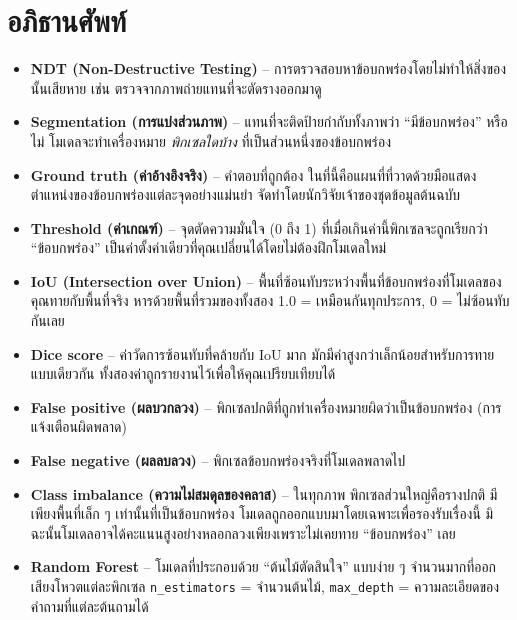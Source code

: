 \documentclass[11pt]{article}
\begin{document}
\section*{อภิธานศัพท์}
\begin{itemize}
  \item \textbf{NDT (Non-Destructive Testing)} -- การตรวจสอบหาข้อบกพร่องโดยไม่ทำให้สิ่งของนั้นเสียหาย เช่น ตรวจจากภาพถ่ายแทนที่จะตัดรางออกมาดู
  \item \textbf{Segmentation (การแบ่งส่วนภาพ)} -- แทนที่จะติดป้ายกำกับทั้งภาพว่า ``มีข้อบกพร่อง'' หรือไม่ โมเดลจะทำเครื่องหมาย \emph{พิกเซลใดบ้าง} ที่เป็นส่วนหนึ่งของข้อบกพร่อง
  \item \textbf{Ground truth (ค่าอ้างอิงจริง)} -- คำตอบที่ถูกต้อง ในที่นี้คือแผนที่ที่วาดด้วยมือแสดงตำแหน่งของข้อบกพร่องแต่ละจุดอย่างแม่นยำ จัดทำโดยนักวิจัยเจ้าของชุดข้อมูลต้นฉบับ
  \item \textbf{Threshold (ค่าเกณฑ์)} -- จุดตัดความมั่นใจ (0 ถึง 1) ที่เมื่อเกินค่านี้พิกเซลจะถูกเรียกว่า ``ข้อบกพร่อง'' เป็นค่าตั้งค่าเดียวที่คุณเปลี่ยนได้โดยไม่ต้องฝึกโมเดลใหม่
  \item \textbf{IoU (Intersection over Union)} -- พื้นที่ซ้อนทับระหว่างพื้นที่ข้อบกพร่องที่โมเดลของคุณทายกับพื้นที่จริง หารด้วยพื้นที่รวมของทั้งสอง 1.0 = เหมือนกันทุกประการ, 0 = ไม่ซ้อนทับกันเลย
  \item \textbf{Dice score} -- ค่าวัดการซ้อนทับที่คล้ายกับ IoU มาก มักมีค่าสูงกว่าเล็กน้อยสำหรับการทายแบบเดียวกัน ทั้งสองค่าถูกรายงานไว้เพื่อให้คุณเปรียบเทียบได้
  \item \textbf{False positive (ผลบวกลวง)} -- พิกเซลปกติที่ถูกทำเครื่องหมายผิดว่าเป็นข้อบกพร่อง (การแจ้งเตือนผิดพลาด)
  \item \textbf{False negative (ผลลบลวง)} -- พิกเซลข้อบกพร่องจริงที่โมเดลพลาดไป
  \item \textbf{Class imbalance (ความไม่สมดุลของคลาส)} -- ในทุกภาพ พิกเซลส่วนใหญ่คือรางปกติ มีเพียงพื้นที่เล็ก ๆ เท่านั้นที่เป็นข้อบกพร่อง โมเดลถูกออกแบบมาโดยเฉพาะเพื่อรองรับเรื่องนี้ มิฉะนั้นโมเดลอาจได้คะแนนสูงอย่างหลอกลวงเพียงเพราะไม่เคยทาย ``ข้อบกพร่อง'' เลย
  \item \textbf{Random Forest} -- โมเดลที่ประกอบด้วย ``ต้นไม้ตัดสินใจ'' แบบง่าย ๆ จำนวนมากที่ออกเสียงโหวตแต่ละพิกเซล \texttt{n\_estimators} = จำนวนต้นไม้, \texttt{max\_depth} = ความละเอียดของคำถามที่แต่ละต้นถามได้
\end{itemize}
\end{document}
